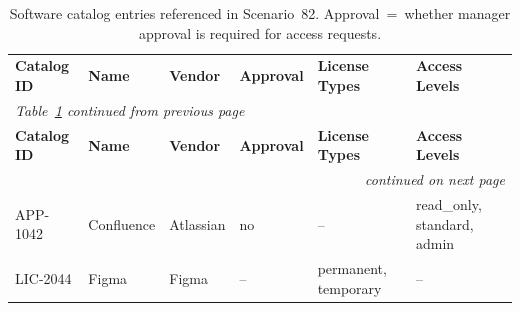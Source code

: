 {\small\begin{longtable}{
  p{}
  p{}
  p{}
  p{}
  p{}
  p{}}
\captionsetup{font=small}
\caption{Software catalog entries referenced in Scenario~82.
Approval~=~whether manager approval is required for access requests.}
\label{tab:scenario82-catalog} \\
\toprule
\textbf{Catalog ID} &
\textbf{Name} &
\textbf{Vendor} &
\textbf{Approval} &
\textbf{License Types} &
\textbf{Access Levels} \\
\midrule
\endfirsthead
\multicolumn{6}{l}{\emph{Table~\ref{tab:scenario82-catalog} continued from previous page}} \\
\toprule
\textbf{Catalog ID} &
\textbf{Name} &
\textbf{Vendor} &
\textbf{Approval} &
\textbf{License Types} &
\textbf{Access Levels} \\
\midrule
\endhead
\midrule \multicolumn{6}{r}{\emph{continued on next page}} \\
\endfoot
\bottomrule
\endlastfoot

APP-1042 & Confluence & Atlassian & no  & --                   & read\_only, standard, admin \\
LIC-2044 & Figma      & Figma     & --  & permanent, temporary & -- \\

\end{longtable}}